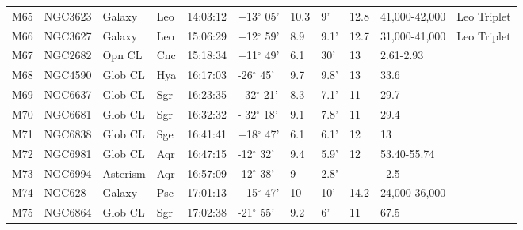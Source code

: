 \documentclass[10pt,twoside,a4paper,english]{article}
\begin{document}
\begin{longtable}{@{}lllllllllll@{}}
M65        & NGC3623     & Galaxy     & Leo       & 14:03:12 & +13$^{\circ}$ 05'  & 10.3      & 9'                   & 12.8     & 41,000-42,000       & Leo Triplet                               \\ 
M66        & NGC3627     & Galaxy     & Leo       & 15:06:29 & +12$^{\circ}$ 59'  & 8.9       & 9.1'                 & 12.7     & 31,000-41,000       & Leo Triplet                               \\ 
M67        & NGC2682     & Opn CL     & Cnc       & 15:18:34 & +11$^{\circ}$ 49'  & 6.1       & 30'                  & 13       & 2.61-2.93           &                                           \\ 
M68        & NGC4590     & Glob CL    & Hya       & 16:17:03 & -26$^{\circ}$ 45'  & 9.7       & 9.8'                 & 13       & 33.6                &                                           \\ 
M69        & NGC6637     & Glob CL    & Sgr       & 16:23:35 & - 32$^{\circ}$ 21' & 8.3       & 7.1'                 & 11       & 29.7                &                                           \\ 
M70        & NGC6681     & Glob CL    & Sgr       & 16:32:32 & - 32$^{\circ}$ 18' & 9.1       & 7.8'                 & 11       & 29.4                &                                           \\ 
M71        & NGC6838     & Glob CL    & Sge       & 16:41:41 & +18$^{\circ}$ 47'  & 6.1       & 6.1'                 & 12       & 13                  &                                           \\ 
M72        & NGC6981     & Glob CL    & Aqr       & 16:47:15 & -12$^{\circ}$ 32'  & 9.4       & 5.9'                 & 12       & 53.40-55.74         &                                           \\ 
M73        & NGC6994     & Asterism   & Aqr       & 16:57:09 & -12$^{\circ}$ 38'  & 9         & 2.8'                 & -        & ~2.5                &                                           \\ 
M74        & NGC628      & Galaxy     & Psc       & 17:01:13 & +15$^{\circ}$ 47'  & 10        & 10'                  & 14.2     & 24,000-36,000       &                                           \\ 
M75        & NGC6864     & Glob CL    & Sgr       & 17:02:38 & -21$^{\circ}$ 55'  & 9.2       & 6'                   & 11       & 67.5                &                                           \\ 

\end{longtable}
\end{document}

